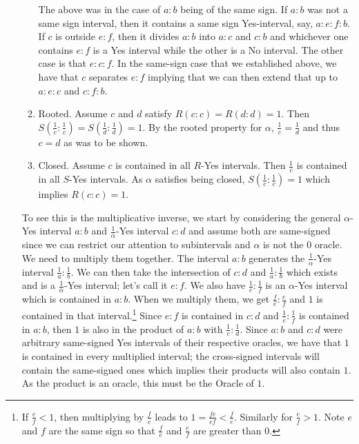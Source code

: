 \documentclass[12pt]{article}
\begin{document}
\begin{itemize}
\begin{enumerate}
        The above was in the case of $a:b$ being of the same sign. If $a:b$ was not a same sign interval, then it contains a same sign Yes-interval, say, $a:e:f:b$. If $c$ is outside $e:f$, then it divides $a:b$ into $a:c$ and $c:b$ and whichever one contains $e:f$ is a Yes interval while the other is a No interval. The other case is that $e:c:f$. In the same-sign case that we established above, we have that $c$ separates $e:f$ implying that we can then extend that up to $a:e:c$ and $c:f:b$.
        \item Rooted. Assume $c$ and $d$ satisfy $R(c:c)=R(d:d)=1$. Then $S(\frac{1}{c}:\frac{1}{c})=S(\frac{1}{d}:\frac{1}{d})=1$. By the rooted property for $\alpha$, $\frac{1}{c} = \frac{1}{d}$ and thus $c=d$ as was to be shown. 
        \item Closed. Assume $c$ is contained in all $R$-Yes intervals. Then $\frac{1}{c}$ is contained in all $S$-Yes intervals. As $\alpha$ satisfies being closed, $S(\frac{1}{c}:\frac{1}{c})=1$ which implies $R(c:c)=1$.
    \end{enumerate}
    
    To see this is the multiplicative inverse, we start by considering the general $\alpha$-Yes interval $a:b$ and $\frac{1}{\alpha}$-Yes interval $c:d$ and assume both are same-signed since we can restrict our attention to subintervals and $\alpha$ is not the 0 oracle. We need to multiply them together. The interval $a:b$ generates the $\frac{1}{\alpha}$-Yes interval $\frac{1}{a}:\frac{1}{b}$. We can then take the intersection of $c:d$ and $\frac{1}{a}:\frac{1}{b}$ which exists and is a $\frac{1}{\alpha}$-Yes interval; let's call it $e:f$. We also have $\frac{1}{e}:\frac{1}{f}$ is an $\alpha$-Yes interval which is contained in $a:b$. When we multiply them, we get $\frac{f}{e}:\frac{e}{f}$ and $1$ is  contained in that interval.\footnote{If $\frac{e}{f} <1$, then multiplying by $\frac{f}{e}$ leads to $1 = \frac{fe}{ef} < \frac{f}{e}$. Similarly for $\frac{e}{f} > 1$. Note $e$ and $f$ are the same sign so that $\frac{f}{e}$ and $\frac{e}{f}$ are greater than 0. } Since $e:f$ is contained in $c:d$ and $\frac{1}{e}:\frac{1}{f}$ is contained in $a:b$, then $1$ is also in the product of $a:b$ with $\frac{1}{c}:\frac{1}{d}$. Since $a:b$ and $c:d$ were arbitrary same-signed Yes intervals of their respective oracles, we have that $1$ is contained in every multiplied interval; the cross-signed intervals will contain the same-signed ones which implies their products will also contain $1$. As the product is an oracle, this must be the Oracle of $1$. 
    
\end{itemize}
\end{document}

